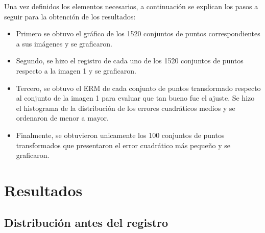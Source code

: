 \documentclass[11pt, letterpaper]{article}
\begin{document}
Una vez definidos los elementos necesarios, a continuación se explican los pasos a seguir para la obtención de los resultados:

\begin{itemize}
	\item Primero se obtuvo el gráfico de los 1520 conjuntos de puntos correspondientes a sus imágenes y se graficaron.
	
	\item Segundo, se hizo el registro de cada uno de los 1520 conjuntos de puntos respecto a la imagen 1 y se graficaron. 
	
	\item Tercero, se obtuvo el ERM de cada conjunto de puntos transformado respecto al conjunto de la imagen 1 para evaluar que tan bueno fue el ajuste. Se hizo el histograma de la distribución de los errores cuadráticos medios y se ordenaron de menor a mayor.
	
	\item Finalmente, se obtuvieron unicamente los 100 conjuntos de puntos transformados que presentaron el error cuadrático más pequeño y se graficaron.
	
\end{itemize}



\newpage
	
\section{Resultados}

\subsection{Distribución antes del registro}
\end{document}
